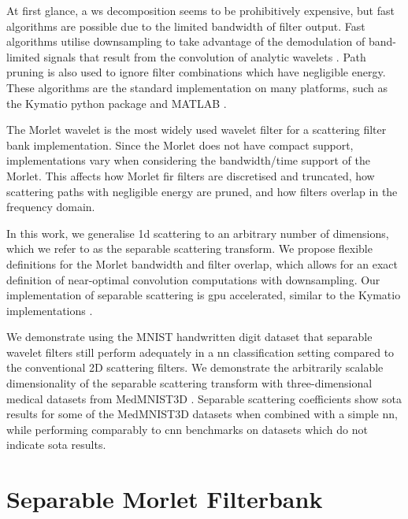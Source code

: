 At first glance, a \ac{ws} decomposition seems to be prohibitively expensive, but fast algorithms are possible due to the limited bandwidth of filter output. Fast algorithms utilise downsampling to take advantage of the demodulation of band-limited signals that result from the convolution of analytic wavelets \citep{2dscattering, 3dscattering, 1dscattering1}. Path pruning is also used to ignore filter combinations which have negligible energy. These algorithms are the standard implementation on many platforms, such as the Kymatio python package \citep{kymatio} and MATLAB \citep{MATLAB}.

The Morlet wavelet is the most widely used wavelet filter for a scattering filter bank implementation. Since the Morlet does not have compact support, implementations vary when considering the bandwidth/time support of the Morlet. This affects how Morlet \ac{fir} filters are discretised and truncated, how scattering paths with negligible energy are pruned, and how filters overlap in the frequency domain. 

In this work, we generalise \ac{1d} scattering to an arbitrary number of dimensions, which we refer to as the separable scattering transform. We propose flexible definitions for the Morlet bandwidth and filter overlap, which allows for an exact definition of near-optimal convolution computations with downsampling. Our implementation of separable scattering is \ac{gpu} accelerated, similar to the Kymatio implementations \citep{kymatio}. 

We demonstrate using the MNIST handwritten digit dataset \citep{mnist} that separable wavelet filters still perform adequately in a \ac{nn} classification setting compared to the conventional 2D scattering filters. We demonstrate the arbitrarily scalable dimensionality of the separable scattering transform with three-dimensional medical datasets from MedMNIST3D \citep{medmnist}. Separable scattering coefficients show \ac{sota} results for some of the MedMNIST3D datasets when combined with a simple \ac{nn}, while performing comparably to \ac{cnn} benchmarks on datasets which do not indicate \ac{sota} results.

\section{Separable Morlet Filterbank}


